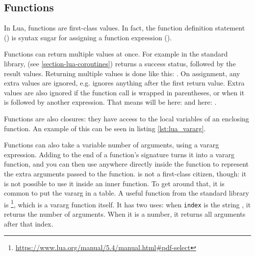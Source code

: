\newpage
\subsection{Functions}
In Lua, functions are first-class values. In fact, the function definition statement () is syntax sugar for assigning a function expression ().

Functions can return multiple values at once. For example in the standard library,  (see \ref{section-lua-coroutines}) returns a success status, followed by the result values. Returning multiple values is done like this: . On assignment, any extra values are ignored, e.g.  ignores anything after the first return value. Extra values are also ignored if the function call is wrapped in parentheses, or when it is followed by another expression. That means  will be  here:  and here: .

Functions are also closures: they have access to the local variables of an enclosing function. An example of this can be seen in listing \ref{lst:lua_vararg}.

Functions can also take a variable number of arguments, using a vararg expression. Adding  to the end of a function's signature turns it into a vararg function, and you can then use  anywhere directly inside the function to represent the extra arguments passed to the function.  is not a first-class citizen, though: it is not possible to use it inside an inner function. To get around that, it is common to put the vararg in a table. A useful function from the standard library is \footnote{\url{https://www.lua.org/manual/5.4/manual.html\#pdf-select}}, which is a vararg function itself. It has two uses: when \texttt{index} is the string , it returns the number of arguments. When it is a number, it returns all arguments after that index.

